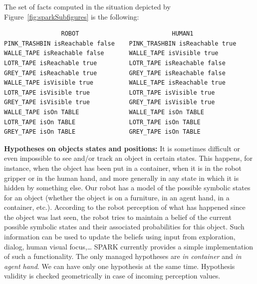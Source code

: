 \documentclass{svmult}
\begin{document}
The set of facts computed in the situation depicted by
Figure~\ref{fig:sparkSubfigures} is the following:
\begin{footnotesize}
\begin{verbatim}
                ROBOT                          HUMAN1
PINK_TRASHBIN isReachable false    PINK_TRASHBIN isReachable true 
WALLE_TAPE isReachable false       WALLE_TAPE isVisible true 
LOTR_TAPE isReachable true         LOTR_TAPE isReachable false 
GREY_TAPE isReachable true         GREY_TAPE isReachable false
WALLE_TAPE isVisible true          WALLE_TAPE isReachable true 
LOTR_TAPE isVisible true           LOTR_TAPE isVisible true 
GREY_TAPE isVisible true           GREY_TAPE isVisible true 
WALLE_TAPE isOn TABLE              WALLE_TAPE isOn TABLE 
LOTR_TAPE isOn TABLE               LOTR_TAPE isOn TABLE 
GREY_TAPE isOn TABLE               GREY_TAPE isOn TABLE 
\end{verbatim}
\end{footnotesize}

\vspace{0.3cm}
\noindent
\textbf{Hypotheses on objects states and positions:}
It is sometimes difficult or even impossible to see and/or track an
object in certain states. This happens, for instance, when the object
has been put in a container, when it is in the robot gripper or in the
human hand, and more generally in any state in which it is hidden by
something else. Our robot has a model of the possible symbolic states
for an object (whether the object is on a furniture, in an agent hand,
in a container, etc.).  According to the robot perception of what has
happened since the object was last seen, the robot tries to maintain a
belief of the current possible symbolic states and their associated
probabilities for this object. Such information can be used to update
the beliefs using input from exploration, dialog, human visual
focus,\ldots
SPARK currently provides a simple implementation of such a functionality. The
only managed hypotheses are \emph{in container} and \emph{in agent hand}. We
can have only one hypothesis at the same time. Hypothesis validity is checked
geometrically in case of incoming perception values.
\end{document}

